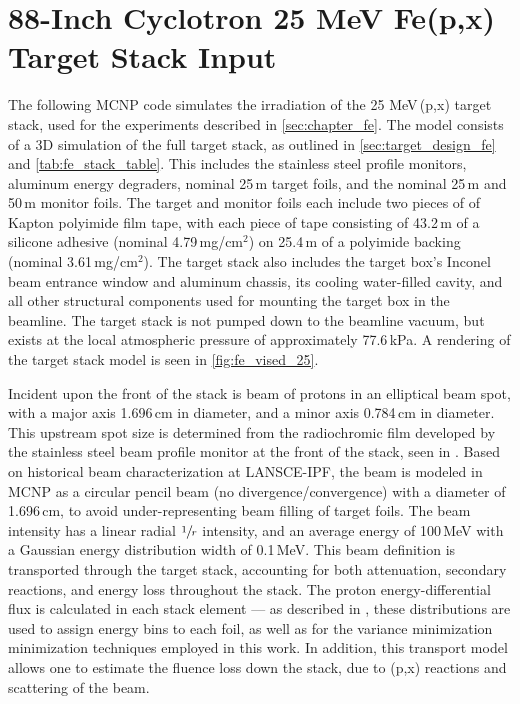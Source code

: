 



\section{88-Inch Cyclotron 25 MeV Fe(p,x) Target Stack Input} \label{sec:88_mcnp_deck_lowE}



The following MCNP code simulates the irradiation of the 25 MeV\,(p,x) target stack, used for the experiments described in  \autoref{sec:chapter_fe}.
The model consists of a 3D simulation of the full target stack, as outlined in \autoref{sec:target_design_fe} and  \autoref{tab:fe_stack_table}.
This includes the stainless steel profile monitors, aluminum energy degraders, nominal 25\,\mmicro m  target foils, and the nominal 25\,\mmicro m   and 50\,\mmicro m  monitor foils.
The target and monitor foils each include two pieces of of Kapton polyimide film tape, with each piece of  tape consisting of 43.2\,\mmicro m of a silicone adhesive (nominal 4.79\,mg/cm$^2$) on 25.4\,\mmicro m of a polyimide backing (nominal 3.61\,mg/cm$^2$).
The target stack also includes the target box's Inconel beam entrance window and aluminum chassis, its cooling water-filled cavity, and all other structural components used for mounting the target box in the beamline.
The target stack is not pumped down to the beamline vacuum, but exists at the local atmospheric pressure of approximately 77.6\,kPa.
A rendering of the target stack model  is seen in \autoref{fig:fe_vised_25}.




Incident upon the front of the stack is  beam of protons in an elliptical beam spot, with a major axis 1.696\,cm in diameter, and a minor axis 0.784\,cm in diameter.  
This upstream spot size is determined from the radiochromic film developed by the  stainless steel beam profile monitor at the front of the stack, seen in .
Based on historical beam characterization at LANSCE-IPF, the beam is modeled in MCNP as a circular pencil beam (no divergence/convergence) with a diameter of 1.696\,cm, to avoid under-representing beam filling of target foils.
The beam intensity has a linear radial $\sfrac{1}{r}$ intensity, and an average energy of 100\,MeV  with a Gaussian energy distribution width of 0.1\,MeV.
This beam definition is transported through the target stack, accounting for both attenuation, secondary reactions, and energy loss throughout the stack.
The proton energy-differential flux is calculated in each stack element --- as described in ,  these distributions are used to assign energy bins  to each foil, as well as for the variance minimization minimization techniques employed in this work.
In addition, this transport model allows one to estimate the fluence loss down the stack, due to (p,x) reactions and scattering of the beam.



